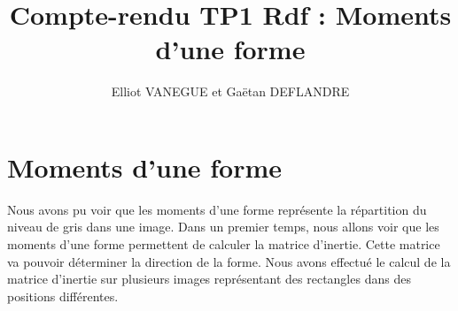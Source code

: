 \documentclass{article}
\title{Compte-rendu TP1 Rdf : Moments d'une forme}
\author{Elliot VANEGUE et Gaëtan DEFLANDRE}
\begin{document}


  \maketitle
  
  \mbox{}
  \newpage
  \clearpage
  
  \section{Moments d'une forme}
  Nous avons pu voir que les moments d'une forme représente la répartition du niveau de gris
  dans une image. Dans un premier temps, nous allons voir que les moments d'une forme permettent
  de calculer la matrice d'inertie. Cette matrice va pouvoir déterminer la direction de la forme.
  Nous avons effectué le calcul de la matrice d'inertie sur plusieurs images représentant des 
  rectangles dans des positions différentes.\\
  
\end{document}

